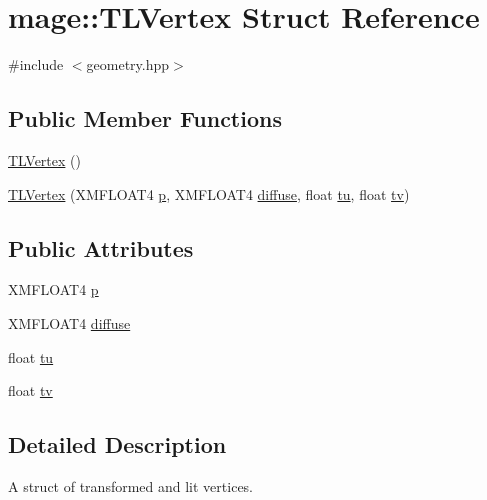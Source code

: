 \hypertarget{structmage_1_1_t_l_vertex}{}\section{mage\+:\+:T\+L\+Vertex Struct Reference}
\label{structmage_1_1_t_l_vertex}


{\ttfamily \#include $<$geometry.\+hpp$>$}

\subsection*{Public Member Functions}
\begin{DoxyCompactItemize}
\item 
\hyperlink{structmage_1_1_t_l_vertex_a281016b2cd959f1084fb69292b2e0609}{T\+L\+Vertex} ()
\item 
\hyperlink{structmage_1_1_t_l_vertex_a13e51ade415e514fce0065684e69b639}{T\+L\+Vertex} (X\+M\+F\+L\+O\+A\+T4 \hyperlink{structmage_1_1_t_l_vertex_a5ac68e9f9767dae9455134891712baf1}{p}, X\+M\+F\+L\+O\+A\+T4 \hyperlink{structmage_1_1_t_l_vertex_a78d60c6622bc1091f2c1c30da0715236}{diffuse}, float \hyperlink{structmage_1_1_t_l_vertex_a33bec24f83d1daf690caf2ca2ead933b}{tu}, float \hyperlink{structmage_1_1_t_l_vertex_aa82b030c0de9e7fe2403b6f540b2149b}{tv})
\end{DoxyCompactItemize}
\subsection*{Public Attributes}
\begin{DoxyCompactItemize}
\item 
X\+M\+F\+L\+O\+A\+T4 \hyperlink{structmage_1_1_t_l_vertex_a5ac68e9f9767dae9455134891712baf1}{p}
\item 
X\+M\+F\+L\+O\+A\+T4 \hyperlink{structmage_1_1_t_l_vertex_a78d60c6622bc1091f2c1c30da0715236}{diffuse}
\item 
float \hyperlink{structmage_1_1_t_l_vertex_a33bec24f83d1daf690caf2ca2ead933b}{tu}
\item 
float \hyperlink{structmage_1_1_t_l_vertex_aa82b030c0de9e7fe2403b6f540b2149b}{tv}
\end{DoxyCompactItemize}


\subsection{Detailed Description}
A struct of transformed and lit vertices. 

